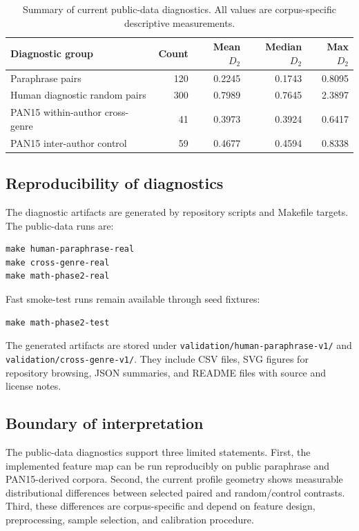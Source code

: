 \documentclass[11pt]{article}
\begin{document}
\begin{table}[t]
    \centering
    \small
    \caption{Summary of current public-data diagnostics. All values are corpus-specific descriptive measurements.}
    \label{tab:public-data-summary}
    \begin{tabular}{lrrrr}
        \toprule
        Diagnostic group & Count & Mean $D_2$ & Median $D_2$ & Max $D_2$ \\
        \midrule
        Paraphrase pairs & 120 & 0.2245 & 0.1743 & 0.8095 \\
        Human diagnostic random pairs & 300 & 0.7989 & 0.7645 & 2.3897 \\
        PAN15 within-author cross-genre & 41 & 0.3973 & 0.3924 & 0.6417 \\
        PAN15 inter-author control & 59 & 0.4677 & 0.4594 & 0.8338 \\
        \bottomrule
    \end{tabular}
\end{table}

\subsection{Reproducibility of diagnostics}

The diagnostic artifacts are generated by repository scripts and Makefile targets. The public-data runs are:
\begin{verbatim}
make human-paraphrase-real
make cross-genre-real
make math-phase2-real
\end{verbatim}
Fast smoke-test runs remain available through seed fixtures:
\begin{verbatim}
make math-phase2-test
\end{verbatim}
The generated artifacts are stored under \texttt{validation/human-paraphrase-v1/} and \texttt{validation/cross-genre-v1/}. They include CSV files, SVG figures for repository browsing, JSON summaries, and README files with source and license notes.

\subsection{Boundary of interpretation}

The public-data diagnostics support three limited statements. First, the implemented feature map can be run reproducibly on public paraphrase and PAN15-derived corpora. Second, the current profile geometry shows measurable distributional differences between selected paired and random/control contrasts. Third, these differences are corpus-specific and depend on feature design, preprocessing, sample selection, and calibration procedure.
\end{document}
